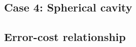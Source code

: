 \documentclass[sn-mathphys,Numbered]{sn-jnl}%
\newcommand{\bb}{\boldsymbol}
\begin{document}
\subsection{Case 4: Spherical cavity}

\subsection{Error-cost relationship}


%


\end{document}
